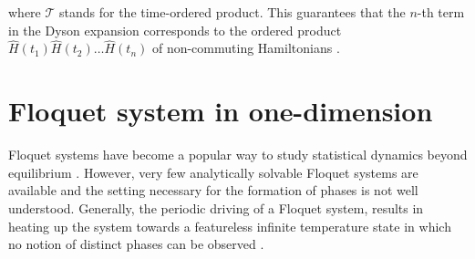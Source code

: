 \documentclass[11pt, a4paper, oneside]{book}
\theoremstyle{definition} %
\begin{document}
	where $\mathcal{T}$ stands for the time-ordered product. This guarantees that the $n$-th term in the Dyson expansion corresponds to the ordered product $\hat{H}(t_1)\hat{H}(t_2)\dots \hat{H}(t_n)$ of non-commuting Hamiltonians \cite{Santoro}. 













\chapter{Floquet system in one-dimension}
Floquet systems have become a popular way to study statistical dynamics beyond equilibrium \cite{Andersen}. However, very few analytically solvable Floquet systems are available and the setting necessary for the formation of phases is not well understood. Generally, the periodic driving of a Floquet system, results in heating up the system towards a featureless infinite temperature state in which no notion of distinct phases can be observed \cite{Potter}. \\
\end{document}
